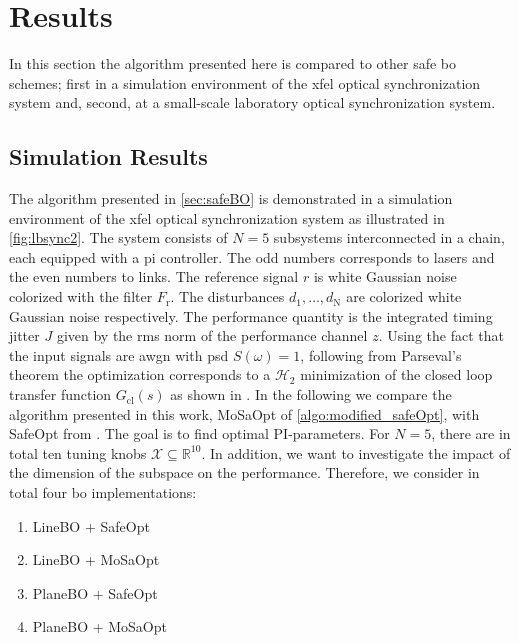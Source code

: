 \documentclass{ifacconf}
\begin{document}
\section{Results} \label{sec:results}
In this section the algorithm presented here is compared to other safe \gls{bo} schemes; first in a simulation environment of the \gls{xfel} optical synchronization system and, second, at a small-scale laboratory optical synchronization system.

\subsection{Simulation Results} \label{subsec:comp}
The algorithm presented in \cref{sec:safeBO} is demonstrated in a simulation environment of the \gls{xfel} optical synchronization system as illustrated in \cref{fig:lbsync2}.
The system consists of \(N=5\) subsystems interconnected in a chain, each equipped with a \gls{pi} controller. The odd numbers corresponds to lasers and the even numbers to links. The reference signal \(r\) is white Gaussian noise colorized with the filter \(F_\mathrm{r}\). The disturbances \(d_1,\dots,d_\mathrm{N}\) are colorized white Gaussian noise respectively. The performance quantity is the integrated timing jitter \(J\) given by the \gls{rms} norm of the performance channel \(z\). Using the fact that the input signals are \gls{awgn} with \gls{psd} \(S(\omega) = 1\), following from Parseval's theorem the optimization corresponds to a \(\mathcal{H}_2\) minimization of the closed loop transfer function \(G_\mathrm{cl}(s)\) as shown in \cite{heuer}.
In the following we compare the algorithm presented in this work, MoSaOpt of \cref{algo:modified_safeOpt}, with SafeOpt from \cite{safeoptberkenkamp}. The goal is to find optimal PI-parameters. For \(N=5\), there are in total ten tuning knobs \(\mathcal{X}\subseteq \mathbb{R}^{10}\). In addition, we want to investigate the impact of the dimension of the subspace on the performance.
Therefore, we consider in total four \gls{bo} implementations:
\begin{enumerate}
\item LineBO + SafeOpt
\item LineBO + MoSaOpt
\item PlaneBO + SafeOpt
\item PlaneBO + MoSaOpt
\end{enumerate}
\end{document}
